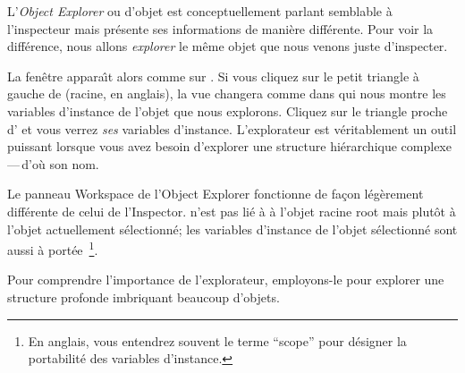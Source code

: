 \documentclass[a4paper,10pt,twoside]{book}
\begin{document}
L'\emph{Object Explorer} ou  d'objet est conceptuellement parlant semblable \`a l'inspecteur mais pr\'esente ses informations de mani\`ere diff\'erente.
Pour voir la diff\'erence, nous allons \emph{explorer} le m\^eme objet
que nous venons juste d'inspecter.

La fen\^etre  appara\^{\i}t alors comme sur
 .
Si vous cliquez sur le petit triangle \`a gauche de  (racine, en anglais), la vue changera comme dans  qui
nous montre les variables d'instance de l'objet que nous explorons.
Cliquez sur le triangle proche d' et vous verrez
\emph{ses} variables d'instance.
L'explorateur est v\'eritablement un outil puissant lorsque vous avez besoin
d'explorer une structure hi\'erarchique complexe\,---\,d'o\`u son nom.

Le panneau Workspace de l'Object Explorer fonctionne de fa\c{c}on
 l\'eg\`erement diff\'erente de celui de l'Inspector.
 n'est pas li\'e \`a \`a l'objet racine root mais plut\^ot
\`a l'objet actuellement s\'electionn\'e; les variables d'instance de
l'objet s\'electionn\'e sont aussi \`a port\'ee~\footnote{En anglais, vous
entendrez souvent le terme ``scope'' pour d\'esigner la portabilit\'e des
variables d'instance.}.

Pour comprendre l'importance de l'explorateur, employons-le pour
explorer une structure profonde imbriquant beaucoup d'objets.

\end{document}
